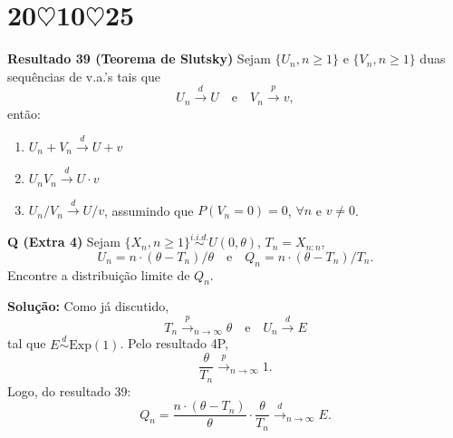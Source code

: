 \section*{20$\heartsuit$10$\heartsuit$25}

\textbf{Resultado 39 (Teorema de Slutsky)} Sejam $\{U_n, n \geq 1\}$ e $\{V_n, n \geq 1\}$ duas sequências de v.a.'s tais que 
\[
U_n \xrightarrow{d} U \quad \text{e} \quad V_n \xrightarrow{p} v,
\]
então:
\begin{enumerate}
    \item $U_n + V_n \xrightarrow{d} U + v$
    \item $U_n V_n \xrightarrow{d} U \cdot v$
    \item $U_n / V_n \xrightarrow{d} U / v$, assumindo que $P(V_n = 0) = 0$, $\forall n$ e $v \neq 0$.
\end{enumerate}

\textbf{Q (Extra 4)} Sejam $\{X_n, n \geq 1\} \overset{i.i.d.}{\sim} U(0, \theta)$, $T_n = X_{n:n}$, 
\[
U_n = n \cdot (\theta - T_n)/\theta \quad \text{e} \quad Q_n = n \cdot (\theta - T_n)/T_n.
\]
Encontre a distribuição limite de $Q_n$.

\textbf{Solução:} Como já discutido,
\[
T_n \xrightarrow{p}_{n \to \infty} \theta \quad \text{e} \quad U_n \xrightarrow{d} E
\]
tal que $E \overset{d}{\sim} \text{Exp}(1)$. Pelo resultado 4P, 
\[
\frac{\theta}{T_n} \xrightarrow{p}_{n \to \infty} 1.
\]
Logo, do resultado 39:
\[
Q_n = \frac{n \cdot (\theta - T_n)}{\theta} \cdot \frac{\theta}{T_n} \xrightarrow{d}_{n \to \infty} E.
\]